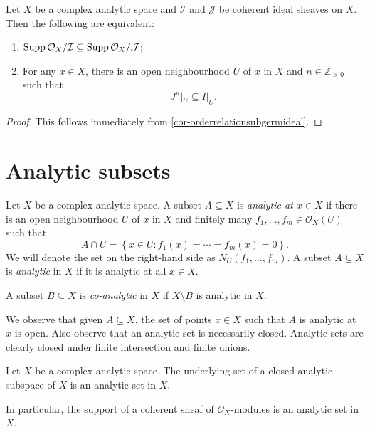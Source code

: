 \begin{corollary}
    Let $X$ be a complex analytic space and $\mathcal{I}$ and $\mathcal{J}$ be coherent ideal sheaves on $X$. Then the following are equivalent:
    \begin{enumerate}
        \item $\operatorname{Supp} \mathcal{O}_X/\mathcal{I}\subseteq \operatorname{Supp} \mathcal{O}_X/\mathcal{J}$;
        \item For any $x\in X$, there is an open neighbourhood $U$ of $x$ in $X$ and $n\in \mathbb{Z}_{>0}$ such that
            \[
                J^n|_U\subseteq I|_U.
            \]
    \end{enumerate}
\end{corollary}
\begin{proof}
    This follows immediately from \cref{cor-orderrelationsubgermideal}.
\end{proof}


\section{Analytic subsets}

\begin{definition}
    Let $X$ be a complex analytic space. A subset $A\subseteq X$ is \emph{analytic at $x\in X$} if there is an open neighbourhood $U$ of $x$ in $X$ and finitely many $f_1,\ldots,f_m\in \mathcal{O}_X(U)$ such that 
    \[
        A\cap U=\left\{ x\in U: f_1(x)=\cdots=f_m(x)=0 \right\}.  
    \]
    We will denote the set on the right-hand side as $N_U(f_1,\ldots,f_m)$.
    A subset $A\subseteq X$ is \emph{analytic} in $X$ if it is analytic at all $x\in X$.

    A subset $B\subseteq X$ is \emph{co-analytic} in $X$ if $X\setminus B$ is analytic in $X$.
\end{definition}
We observe that given $A\subseteq X$, the set of points $x\in X$ such that $A$ is analytic at $x$ is open. Also observe that an analytic set is necessarily closed.
Analytic sets are clearly closed under finite intersection and finite unions.

\begin{example}\label{ex-closedanalyticspaceanalyt}
    Let $X$ be a complex analytic space. 
    The underlying set of a closed analytic subspace of $X$ is an analytic set in $X$.

    In particular, the support of a coherent sheaf of $\mathcal{O}_X$-modules is an analytic set in $X$.
\end{example}

